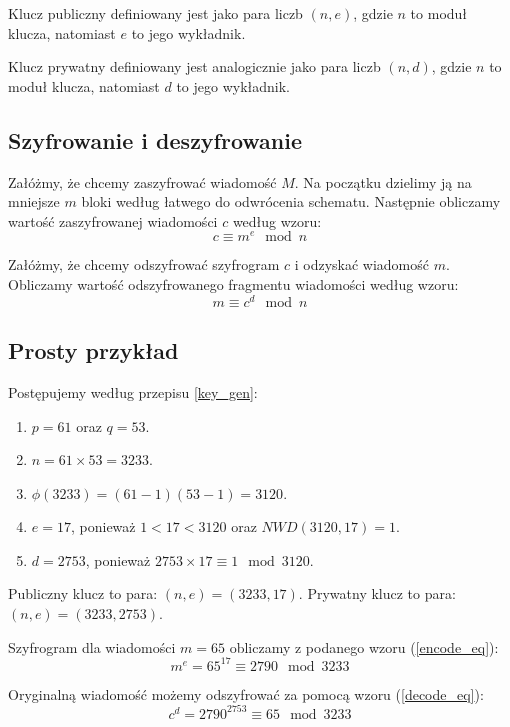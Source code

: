 \documentclass[10pt,a4paper]{article}
\begin{document}
Klucz publiczny definiowany jest jako para liczb $(n, e)$, gdzie $n$ to moduł klucza, natomiast $e$ to jego wykładnik.

Klucz prywatny definiowany jest analogicznie jako para liczb $(n, d)$, gdzie $n$ to moduł klucza, natomiast $d$ to jego wykładnik.

\subsection{Szyfrowanie i deszyfrowanie} \label{encode_decode}
Załóżmy, że chcemy zaszyfrować wiadomość $M$. Na początku dzielimy ją na mniejsze $m$ bloki według łatwego do odwrócenia schematu. Następnie obliczamy wartość zaszyfrowanej wiadomości $c$ według wzoru:
\begin{equation} \label{encode_eq}
c \equiv m^e \mod n
\end{equation} 

Załóżmy, że chcemy odszyfrować szyfrogram $c$ i odzyskać wiadomość $m$. Obliczamy wartość odszyfrowanego fragmentu wiadomości według wzoru:
\begin{equation} \label{decode_eq}
m \equiv c^d \mod n
\end{equation}

\subsection{Prosty przykład}

Postępujemy według przepisu \ref{key_gen}:

\begin{enumerate}
\item $p = 61$ oraz $q = 53$.
\item $n = 61 \times 53 = 3233 $.
\item $\phi(3233) = (61-1)(53-1) = 3120$.
\item $e=17$, ponieważ $1<17<3120$ oraz $NWD(3120, 17) = 1$.
\item $d=2753$, ponieważ $2753 \times 17 \equiv 1 \mod 3120$.
\end{enumerate}

Publiczny klucz to para: $(n, e)=(3233,17)$.
Prywatny klucz to para: $(n, e)=(3233,2753)$.

Szyfrogram dla wiadomości $m = 65$ obliczamy z podanego wzoru (\ref{encode_eq}):
\begin{equation} 
m^e = 65^{17} \equiv 2790 \mod 3233
\end{equation}

Oryginalną wiadomość możemy odszyfrować za pomocą wzoru (\ref{decode_eq}):
\begin{equation} 
c^d = 2790^{2753} \equiv 65 \mod 3233
\end{equation}
\end{document}
